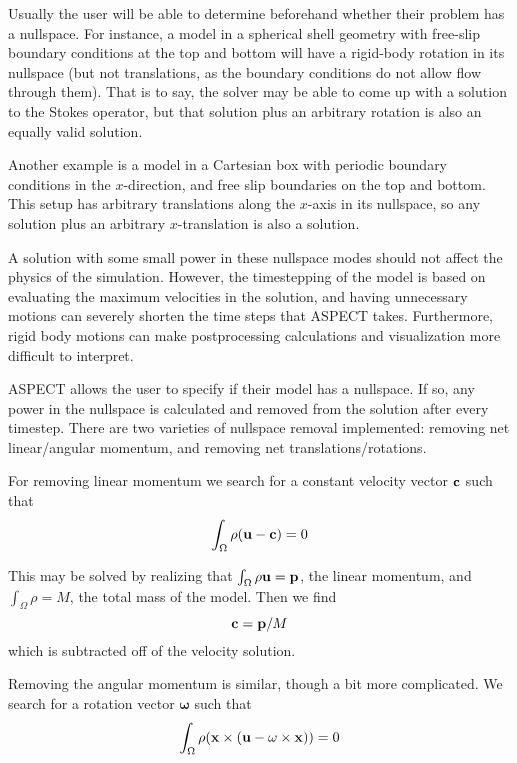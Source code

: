\documentclass{article}
\newcommand{\aspect}{\textsc{ASPECT}}
\begin{document}
Usually the user will be able to determine beforehand whether their problem has a nullspace.  For instance, 
a model in a spherical shell geometry with free-slip boundary conditions at the top and bottom will 
have a rigid-body rotation in its nullspace (but not translations, as the boundary conditions do not 
allow flow through them).  That is to say, the solver may be able to come up with a solution to 
the Stokes operator, but that solution plus an arbitrary rotation is also an equally valid solution.

Another example is a model in a Cartesian box with periodic boundary conditions in the $x$-direction, 
and free slip boundaries on the top and bottom. This setup has arbitrary translations along the $x$-axis 
in its nullspace, so any solution plus an arbitrary $x$-translation is also a solution.

A solution with some small power in these nullspace modes should not affect the physics of the simulation. 
However, the timestepping of the model is based on evaluating the maximum velocities in the solution, 
and having unnecessary motions can severely shorten the time steps that \aspect{} takes. 
Furthermore, rigid body motions can make postprocessing calculations and visualization more 
difficult to interpret.  

\aspect{} allows the user to specify if their model has a nullspace. If so, any power in the nullspace 
is calculated and removed from the solution after every timestep.
There are two varieties of nullspace removal implemented: removing net linear/angular momentum, and 
removing net translations/rotations. 

For removing linear momentum we search for a constant velocity vector $\bf c$ such that 
\begin{equation*}
\int_\Omega \rho ({\bf u - c}) = 0
\end{equation*}

This may be solved by realizing that $\int_\Omega \rho {\bf u} = {\bf p}$, the linear momentum, and 
$\int_\Omega \rho = M$, the total mass of the model.  Then we find 
\begin{equation*}
{\bf c} = {\bf p}/M
\end{equation*}
which is subtracted off of the velocity solution.
 
Removing the angular momentum is similar, though a bit more complicated. 
We search for a rotation vector $\mathbf \omega$ such that 
\begin{equation*}
\int_\Omega \rho ( {\bf x \times (u - {\mathbf \omega} \times x) } ) = 0
\end{equation*}
\end{document}
